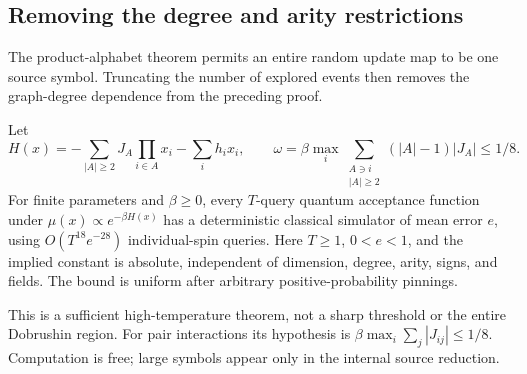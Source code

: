 \subsection{Removing the degree and arity restrictions}
\label{resolution-dynamics:arbitrary-degree}

The product-alphabet theorem permits an entire random update map to be
one source symbol. Truncating the number of explored events then removes
the graph-degree dependence from the preceding proof.

\begin{theorem}
\label{thm:resolution-dynamics-arbitrary-degree}
Let
\[
 H(x)=-\sum_{|A|\ge2}J_A\prod_{i\in A}x_i-\sum_i h_ix_i,
 \qquad
 \omega=\beta\max_i\sum_{\substack{A\ni i\\|A|\ge2}}
                       (|A|-1)|J_A|\le1/8.
\]
For finite parameters and \(\beta\ge0\), every \(T\)-query quantum
acceptance function under \(\mu(x)\propto e^{-\beta H(x)}\) has a
deterministic classical simulator of mean error \(e\), using
\(O(T^{18}e^{-28})\) individual-spin queries. Here \(T\ge1\),
\(0<e<1\), and the implied constant is absolute, independent of
dimension, degree, arity, signs, and fields. The bound is uniform after
arbitrary positive-probability pinnings.
\end{theorem}

This is a sufficient high-temperature theorem, not a sharp threshold
or the entire Dobrushin region. For pair interactions its hypothesis is
\(\beta\max_i\sum_j|J_{ij}|\le1/8\). Computation is free; large
symbols appear only in the internal source reduction.

